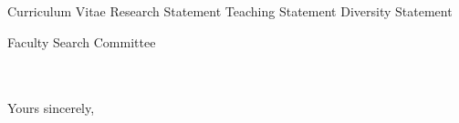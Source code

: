 



\addAttach%
{Curriculum Vitae}%
{Research Statement}%
{Teaching Statement}%
{Diversity Statement}
\def\appSpecific{with significant implications for the research fields related to Computer Engineering \& Systems Group (CESG)}

\def\appJobID{%
    \ifthenelse{\equal{\jobID}{}}{\unskip}{\unskip\textemdash Job \# \jobID{}}%
}
\def\toAddr{%
Faculty Search Committee \\ \appDept{} \\ \appSchool{} \\ \appAddr{}%
}

\begin{letter}{\toAddr{}}
    \opening{\myOpening{}}
    
    \collabCustom{}%
    
    \closing{Yours sincerely,}
    \encl{\listAttach{}}
\end{letter}
